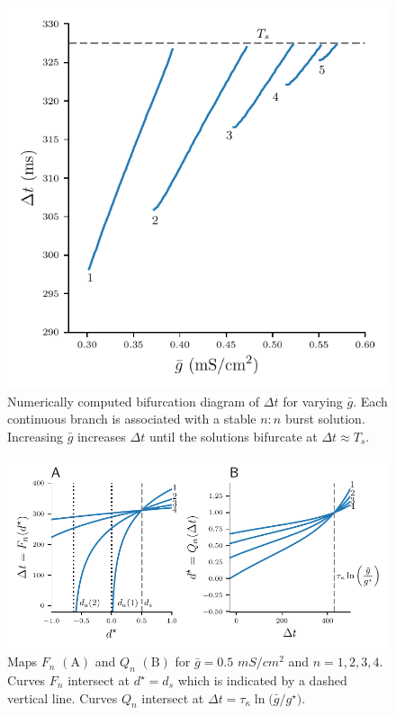 \documentclass[utf8]{frontiersFPHY} %
\newcommand{\gbar}{\bar g}
\newcommand{\delt}{\Delta t}
\begin{document}
\begin{figure}[h!]
  \centering
  \includegraphics{delta-t}
  \caption{Numerically computed bifurcation diagram of $\delt$ for varying $\gbar$.
    Each continuous branch is associated with a stable $n:n$ burst solution. Increasing
    $\gbar$ increases $\Delta t$ until the solutions bifurcate at $\Delta t\approx
    T_{s}$.~\label{fig:delta-t}}
\end{figure}

\begin{figure}[h!]
  \centering
  \includegraphics{FQ-maps}
  \caption{Maps $F_n$ $\bm{\mathrm{(A)}}$ and $Q_n$ $\bm{\mathrm{(B)}}$ for
  $\gbar=0.5$ $\si{mS/cm^{2}}$ and $n=1,2,3,4$. Curves $F_n$ intersect at
  $d^{\star}=d_{s}$ which is indicated by a dashed vertical line. Curves $Q_n$ intersect at $\Delta t = \tau_{\kappa}\ln\Big(\bar g / g^{\star}\Big)$. \label{fig:FQ-maps}}
\end{figure}
\end{document}

